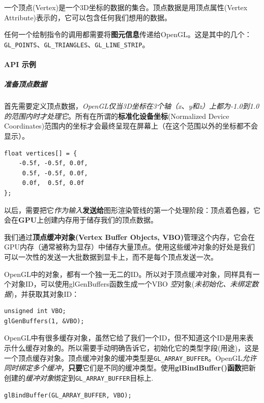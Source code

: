 \documentclass[UTF8,a4paper,12pt]{ctexbook}
\begin{document}
				一个顶点(Vertex)是一个3D坐标的数据的集合。顶点数据是用顶点属性(Vertex Attribute)表示的，它可以包含任何我们想用的数据。
				
				任何一个绘制指令的调用都需要将\textbf{图元信息}传递给OpenGL。这是其中的几个：\verb|GL_POINTS|、\verb|GL_TRIANGLES|、\verb|GL_LINE_STRIP|。
				
			\paragraph{API 示例}
			
				\subparagraph{准备顶点数据}
					首先需要定义顶点数据，\textit{OpenGL仅当3D坐标在3个轴（x、y和z）上都为-1.0到1.0的范围内时才处理它}。所有在所谓的\textbf{标准化设备坐标}(Normalized Device Coordinates)范围内的坐标才会最终呈现在屏幕上（在这个范围以外的坐标都不会显示）。
					
					\begin{lstlisting}
float vertices[] = {
    -0.5f, -0.5f, 0.0f,
     0.5f, -0.5f, 0.0f,
     0.0f,  0.5f, 0.0f
};				
					\end{lstlisting}
					
					以后，需要把它\textit{作为输入}\textbf{发送给}图形渲染管线的第一个处理阶段：顶点着色器，它会在\textbf{GPU}上创建内存用于储存我们的顶点数据。
					
					我们通过\textbf{顶点缓冲对象(Vertex Buffer Objects, VBO)}管理这个内存，它会在GPU内存（通常被称为显存）中储存大量顶点。使用这些缓冲对象的好处是我们可以一次性的发送一大批数据到显卡上，而不是每个顶点发送一次。
					
					OpenGL中的对象，都有一个独一无二的ID。所以对于顶点缓冲对象，同样具有一个对象ID，可以使用glGenBuffers函数生成一个VBO \textit{空}对象(\textit{未初始化、未绑定数据})，并获取其对象ID：
					
					\begin{lstlisting}
unsigned int VBO;
glGenBuffers(1, &VBO);				
					\end{lstlisting}
					
					OpenGL中有很多缓存对象，虽然它给了我们一个ID，但不知道这个ID是用来表示什么缓存对象的。所以需要手动明确告诉它，初始化它的类型字段(用途)，这是一个顶点缓存对象。顶点缓冲对象的缓冲类型是\verb|GL_ARRAY_BUFFER|。OpenGL\textit{允许同时绑定多个缓冲}，\textbf{只要}它们是不同的缓冲类型。使用\textbf{glBindBuffer()函数}把新创建的\textit{缓冲对象}绑定到\verb|GL_ARRAY_BUFFER|目标上.
					
					\begin{lstlisting}
glBindBuffer(GL_ARRAY_BUFFER, VBO);
					\end{lstlisting}
					
\end{document}
